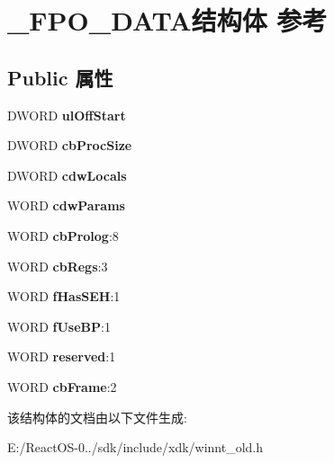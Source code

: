 \hypertarget{struct___f_p_o___d_a_t_a}{}\section{\+\_\+\+F\+P\+O\+\_\+\+D\+A\+T\+A结构体 参考}
\label{struct___f_p_o___d_a_t_a}
\subsection*{Public 属性}
\begin{DoxyCompactItemize}
\item 
\mbox{\label{struct___f_p_o___d_a_t_a_a244c5f3e5e79208ceebad9f44ca6811c}} 
D\+W\+O\+RD {\bfseries ul\+Off\+Start}
\item 
\mbox{\label{struct___f_p_o___d_a_t_a_affeac8e04eb859739befdcadfd158cb4}} 
D\+W\+O\+RD {\bfseries cb\+Proc\+Size}
\item 
\mbox{\label{struct___f_p_o___d_a_t_a_a91e966efca7fed19ea6947c8356904e8}} 
D\+W\+O\+RD {\bfseries cdw\+Locals}
\item 
\mbox{\label{struct___f_p_o___d_a_t_a_a35ff1270169a7deeae3ca1f222e795e4}} 
W\+O\+RD {\bfseries cdw\+Params}
\item 
\mbox{\label{struct___f_p_o___d_a_t_a_a626d35ff6b2e8ebf41d8a10eb42d5e39}} 
W\+O\+RD {\bfseries cb\+Prolog}\+:8
\item 
\mbox{\label{struct___f_p_o___d_a_t_a_a5af1ff697257ce3ad0b92ea1e35a93fb}} 
W\+O\+RD {\bfseries cb\+Regs}\+:3
\item 
\mbox{\label{struct___f_p_o___d_a_t_a_a4b3422f64fb3f071dcfc82abcaf5ae6d}} 
W\+O\+RD {\bfseries f\+Has\+S\+EH}\+:1
\item 
\mbox{\label{struct___f_p_o___d_a_t_a_a49e4bc2d54d066910ff68795566f9ad4}} 
W\+O\+RD {\bfseries f\+Use\+BP}\+:1
\item 
\mbox{\label{struct___f_p_o___d_a_t_a_a4b94cdab7fe998e179f43a672759e541}} 
W\+O\+RD {\bfseries reserved}\+:1
\item 
\mbox{\label{struct___f_p_o___d_a_t_a_a2e6f521cdc6947cb0a21d4983f5cd51f}} 
W\+O\+RD {\bfseries cb\+Frame}\+:2
\end{DoxyCompactItemize}


该结构体的文档由以下文件生成\+:\begin{DoxyCompactItemize}
\item 
E\+:/\+React\+O\+S-\/0../sdk/include/xdk/winnt\+\_\+old.\+h\end{DoxyCompactItemize}
